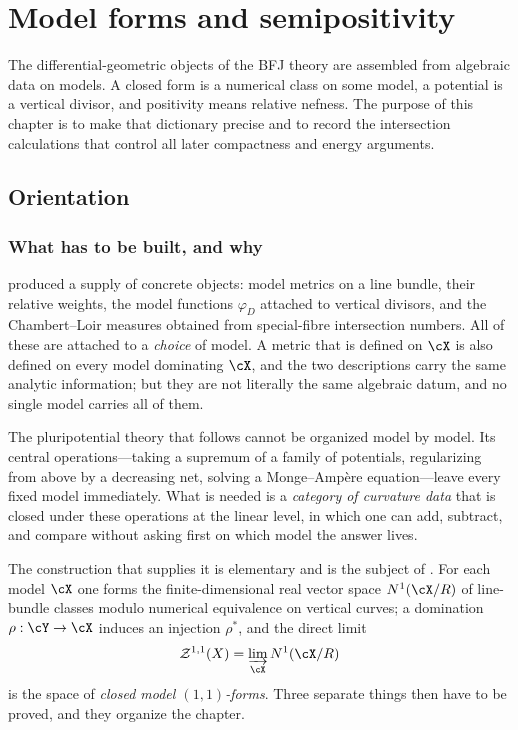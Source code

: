 \chapter{Model forms and semipositivity}
\label{chap:bfj-model-forms}

The differential-geometric objects of the BFJ theory are assembled from
algebraic data on models.  A closed form is a numerical class on some model,
a potential is a vertical divisor, and positivity means relative nefness.
The purpose of this chapter is to make that dictionary precise and to record
the intersection calculations that control all later compactness and energy
arguments.

\section{Orientation}
\label{sec:ch20-orientation}

\subsection{What has to be built, and why}
\label{sec:ch20-why}

 produced a supply of concrete objects: model metrics on a
line bundle, their relative weights, the model functions
\(\varphi_D\) attached to vertical divisors, and the Chambert--Loir measures
obtained from special-fibre intersection numbers.  All of these are attached
to a \emph{choice} of model.  A metric that is defined on \(\cX\) is also
defined on every model dominating \(\cX\), and the two descriptions carry the
same analytic information; but they are not literally the same algebraic
datum, and no single model carries all of them.

The pluripotential theory that follows cannot be organized model by model.
Its central operations---taking a supremum of a family of potentials,
regularizing from above by a decreasing net, solving a Monge--Amp\`ere
equation---leave every fixed model immediately.  What is needed is a
\emph{category of curvature data} that is closed under these operations at
the linear level, in which one can add, subtract, and compare without asking
first on which model the answer lives.

The construction that supplies it is elementary and is the subject of
.  For each model \(\cX\) one
forms the finite-dimensional real vector space \(N^1(\cX/R)\) of line-bundle
classes modulo numerical equivalence on vertical curves; a domination
\(\rho:\cY\to\cX\) induces an injection \(\rho^*\), and the direct limit
\[
 \mathcal Z^{1,1}(X)=\varinjlim_{\cX}N^1(\cX/R)
\]
is the space of \emph{closed model \((1,1)\)-forms}.  Three separate things
then have to be proved, and they organize the chapter.

